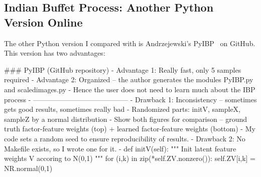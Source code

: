 \subsection{Indian Buffet Process: Another Python Version Online}

The other Python version I compared with is Andrzejewski's PyIBP~\cite{ibpgithub} on GitHub. This version has two advantages: 





### PyIBP (GitHub repository)
- Advantage 1: Really fast, only 5 samples required
- Advantage 2: Organized -- the author generates the modules PyIBP.py and scaledimages.py
- Hence the user does not need to learn much about the IBP process
- -----------------------------------------
- Drawback 1: Inconsistency -- sometimes gets good results, sometimes really bad
- Randomized parts: initV, sampleX, sampleZ by a normal distribution
- Show both figures for comparison -- ground truth factor-feature weights (top) + learned factor-feature weights (bottom)
- My code sets a random seed to ensure reproducibility of results.
- Drawback 2: No Makefile exists, so I wrote one for it.
-  def initV(self):
        """ Init latent feature weights V accoring to N(0,1) """        
        for (i,k) in zip(*self.ZV.nonzero()):
            self.ZV[i,k] = NR.normal(0,1)
